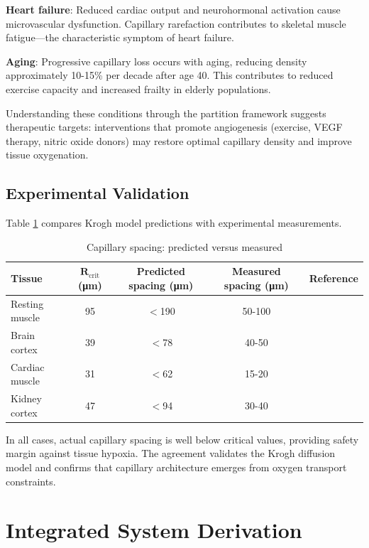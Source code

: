 \documentclass[12pt,a4paper]{article}
\theoremstyle{remark}
\begin{document}
\textbf{Heart failure}: Reduced cardiac output and neurohormonal activation cause microvascular dysfunction. Capillary rarefaction contributes to skeletal muscle fatigue—the characteristic symptom of heart failure.

\textbf{Aging}: Progressive capillary loss occurs with aging, reducing density approximately 10-15\% per decade after age 40. This contributes to reduced exercise capacity and increased frailty in elderly populations.

Understanding these conditions through the partition framework suggests therapeutic targets: interventions that promote angiogenesis (exercise, VEGF therapy, nitric oxide donors) may restore optimal capillary density and improve tissue oxygenation.

\subsection{Experimental Validation}

Table \ref{tab:capillary_validation} compares Krogh model predictions with experimental measurements.

\begin{table}[h]
\centering
\caption{Capillary spacing: predicted versus measured}
\label{tab:capillary_validation}
\begin{tabular}{lcccc}
\toprule
\textbf{Tissue} & \textbf{$\boldsymbol{R_{\mathrm{crit}}}$ (μm)} & \textbf{Predicted spacing (μm)} & \textbf{Measured spacing (μm)} & \textbf{Reference} \\
\midrule
Resting muscle & 95 & $<$190 & 50-100 & \cite{hudlicka1992muscle} \\
Brain cortex & 39 & $<$78 & 40-50 & \cite{pawlik1981quantitative} \\
Cardiac muscle & 31 & $<$62 & 15-20 & \cite{rakusan1971quantitative} \\
Kidney cortex & 47 & $<$94 & 30-40 & \cite{beeuwkes1975renal} \\
\bottomrule
\end{tabular}
\end{table}

In all cases, actual capillary spacing is well below critical values, providing safety margin against tissue hypoxia. The agreement validates the Krogh diffusion model and confirms that capillary architecture emerges from oxygen transport constraints.

\section{Integrated System Derivation}
\label{sec:integrated}
\end{document}

